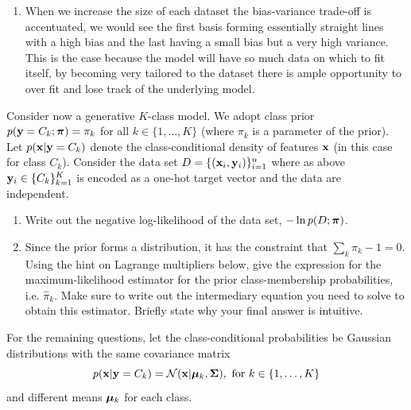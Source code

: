 \documentclass[submit]{harvardml}
\begin{document}
\begin{enumerate}
    \item When we increase the size of each dataset the bias-variance trade-off is accentuated, we would see the first basis forming essentially straight lines with a high bias and the last having a small bias but a very high variance. This is the case because the model will have so much data on which to fit itself, by becoming very tailored to the dataset there is ample opportunity to over fit and lose track of the underlying model.
\end{enumerate}
\begin{problem}

  Consider now a generative $K$-class model.  We adopt class prior
  $p(\mathbf{y} = C_k; \boldsymbol{\pi}) = \pi_k$ for all $k \in \{1, \ldots, K\}$
(where $\pi_k$ is a parameter of the prior).
Let  $p(\mathbf{x}|\mathbf{y}=C_k)$ denote
the class-conditional density of features $\mathbf{x}$ (in this
case for class $C_k$). Consider the data set $D = \{(\mathbf{x}_i,
\mathbf{y}_i)\}_{i=1}^n$ where as above $\mathbf{y}_i \in \{C_k\}_{k=1}^K$ is
encoded as a one-hot target vector and the data are independent.

\begin{enumerate}
  \item Write out the negative log-likelihood of the data set, $-\ln p(D ; \boldsymbol{\pi})$.

  \item Since the prior forms a distribution, it has the constraint that
    $\sum_k\pi_k - 1 = 0$.  Using the hint on
Lagrange multipliers below, give the
    expression for the maximum-likelihood estimator for the prior
    class-membership probabilities, i.e.
    $\hat \pi_k.$
    Make sure to write out the intermediary equation you need
    to solve to obtain this estimator. Briefly state why your final answer is intuitive.
\end{enumerate}

    For the remaining questions, let the
    class-conditional probabilities be Gaussian distributions with
the same covariance matrix
    $$p(\mathbf{x} | \mathbf{y} = C_k) = \mathcal{N}(\mathbf{x} |  \boldsymbol{\mu}_k, \mathbf{\Sigma}), \text{\ for\ }k \in \{1,\ldots, K\}$$
    and different means $\boldsymbol{\mu}_k$ for each class.


\end{problem}
\end{document}
